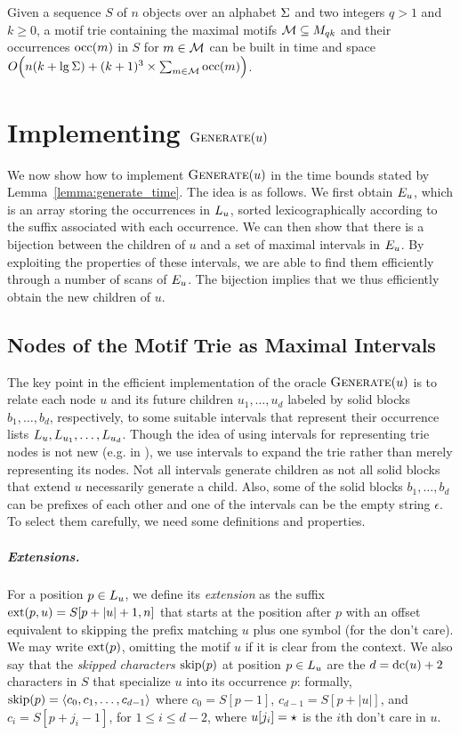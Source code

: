 \begin{theorem}\label{the:trie}
    Given a sequence $S$ of $n$ objects over an alphabet $\Sigma$ and two integers $q > 1$ and $k \geq 0$, a motif trie containing the maximal motifs $\mathcal{M} \subseteq M_{qk}$ and their occurrences $\operatorname{occ}(m)$ in $S$ for $m \in \mathcal{M}$  can be built in time and space
$O \Bigl( n (k + \lg \Sigma) + (k+1)^3 \times \sum_{m \in \mathcal{M}} \operatorname{occ}(m) \Bigr)$.
\end{theorem}


\section{Implementing $\operatorname{\textsc{Generate}}(u)$}\label{sec:generate}
We now show how to implement $\operatorname{\textsc{Generate}}(u)$ in the time bounds stated by Lemma~\ref{lemma:generate_time}. The idea is as follows. We first obtain $E_{u}$, which is an array storing the occurrences in $L_{u}$, sorted lexicographically according to the suffix associated with each occurrence. We can then show that there is a bijection between the children of $u$ and a set of maximal intervals in $E_{u}$. By exploiting the properties of these intervals, we are able to find them efficiently through a number of scans of $E_{u}$. The bijection implies that we thus efficiently obtain the new children of $u$.


\subsection{Nodes of the Motif Trie as Maximal Intervals}
\label{sub:intervals}
The key point in the efficient implementation of the oracle $\operatorname{\textsc{Generate}}(u)$ is to relate each node $u$ and its future children $u_1, \ldots, u_d$ labeled by solid blocks $b_1, \ldots, b_d$, respectively, to some suitable intervals that represent their occurrence lists $L_{u}, L_{u_1}, \ldots, L_{u_d}$. 
Though the idea of using intervals for representing trie nodes is not new (e.g. in \cite{abouelhoda2004replacing}), we use intervals to expand the trie rather than merely representing its nodes. Not all intervals generate children as not all solid blocks that extend $u$ necessarily generate a child. Also, some of the solid blocks $b_1, \ldots, b_d$ can be prefixes of each other and one of the intervals can be the empty string $\epsilon$. To select them carefully, we need some definitions and properties.

\subparagraph*{Extensions.}
%
For a position $p \in L_{u}$, we define its \emph{extension} as the suffix $\operatorname{ext}(p, u) = S[p + |u| + 1, n]$ that starts at the position after $p$ with an offset equivalent to skipping the prefix matching $u$ plus one symbol (for the don't care). We may write $\operatorname{ext}(p)$, omitting the motif $u$ if it is clear from the context. We also say that the \emph{skipped characters} $\operatorname{skip}(p)$ at position $p \in L_{u}$ are the $d=\operatorname{dc}(u)+2$ characters in $S$ that specialize $u$ into its occurrence $p$: formally,  $\operatorname{skip}(p) = \langle c_0, c_1, \ldots, c_{d-1}  \rangle$ where $c_0 = S[p-1]$, $c_{d-1} = S[p+|u|]$, and $c_i = S[p+j_i-1]$, for $1 \leq i \leq d-2$, where $u[j_i] = \star$ is the $i$th don't care in $u$. 

